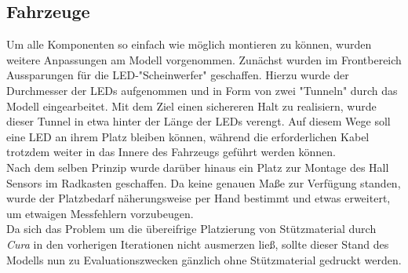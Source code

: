\documentclass[.../Dokumentation.tex]{subfiles}
\begin{document}
\subsection{Fahrzeuge}\label{sec-ita3-cars}
Um alle Komponenten so einfach wie möglich montieren zu können, wurden 
weitere Anpassungen am Modell vorgenommen. 
Zunächst wurden im Frontbereich Aussparungen für die LED-"Scheinwerfer" 
geschaffen. Hierzu wurde der Durchmesser der LEDs aufgenommen und in Form von 
zwei "Tunneln" durch das Modell eingearbeitet. Mit dem Ziel einen sichereren 
Halt zu realisiern, wurde dieser Tunnel in etwa hinter der Länge der LEDs 
verengt. Auf diesem Wege soll eine LED an ihrem Platz bleiben können, 
während die erforderlichen Kabel trotzdem weiter in das Innere des Fahrzeugs 
geführt werden können.\\
Nach dem selben Prinzip wurde darüber hinaus ein Platz zur Montage des Hall 
Sensors im Radkasten geschaffen. Da keine genauen Maße zur Verfügung standen, 
wurde der Platzbedarf näherungsweise per Hand bestimmt und etwas erweitert, um 
etwaigen Messfehlern vorzubeugen.\\
Da sich das Problem um die übereifrige Platzierung von Stützmaterial durch 
\textit{Cura} in den vorherigen Iterationen nicht ausmerzen ließ, sollte 
dieser Stand des Modells nun zu Evaluationszwecken gänzlich ohne Stützmaterial 
gedruckt werden.
\end{document}
